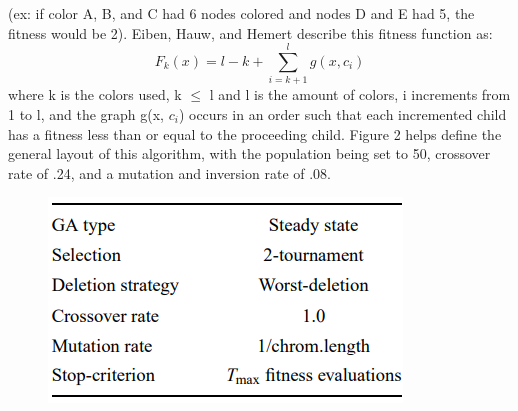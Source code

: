 \documentclass{article}
\begin{document}
(ex:  if color A, B, and C had 6 nodes colored and nodes D and E had 5, the fitness would be 2). Eiben, Hauw, and Hemert describe this fitness function as: 
  \begin{equation}
       F_{k}(x) = l - k + \sum_{i=k+1}^l g(x, c_{i})
  \end{equation}
  where k is the colors used, k $\le$ l and l is the amount of colors, i increments from 1 to l, and the graph g(x, $c_{i}$) occurs in an order such that each incremented child has a fitness less than or equal to the proceeding child. Figure 2 helps define the general layout of this algorithm, with the population being set to 50, crossover rate of .24, and a mutation and inversion rate of .08.
  \begin{figure}
    \centering
    \caption{}
    \includegraphics[scale=.6]{ex3.png}
   \end{figure}
\end{document}
